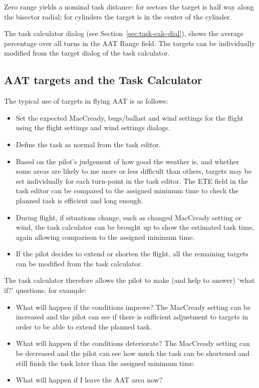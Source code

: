 \documentclass[a4paper,12pt]{refrep}
\begin{document}
Zero range yields a nominal task distance: for sectors the target is
half way along the bisector radial; for cylinders the target is in the
center of the cylinder.

The task calculator dialog (see Section~\ref{sec:task-calc-dial}), shows the
average percentage over all turns in the AAT Range field.
The targets can be individually modified from the target dialog of the task
calculator.


\subsection*{AAT targets and the Task Calculator}

The typical use of targets in flying AAT is as follows:
\begin{itemize}
\item Set the expected MacCready, bugs/ballast and wind settings
  for the flight using the flight settings and wind settings dialogs.
\item Define the task as normal from the task editor.
\item Based on the pilot's judgement of how good the weather is,
  and whether some areas are likely to me more or less difficult than
  others, targets may be set individually for each turn-point in the
  task editor.  The ETE field in the task editor can be compared to
  the assigned minimum time to check the planned task is efficient and
  long enough.
\item During flight, if situations change, such as changed MacCready setting
  or wind, the task calculator can be brought up to show the estimated
  task time, again allowing comparison to the assigned minimum time.
\item If the pilot decides to extend or shorten the flight, all the remaining
  targets can be modified from the task calculator. 
\end{itemize}

The task calculator therefore allows the pilot to make (and help to
answer) `what if?' questions, for example:
\begin{itemize}
\item What will happen if the conditions improve?  The MacCready setting can be 
increased and the pilot can see if there is sufficient adjustment to targets in 
order to be able to extend the planned task.
\item What will happen if the conditions deteriorate?  The MacCready setting can 
be decreased and the pilot can see how much the task can be shortened and still 
finish the task later than the assigned minimum time.
\item What will happen if I leave the AAT area now?
\end{itemize}
\end{document}

